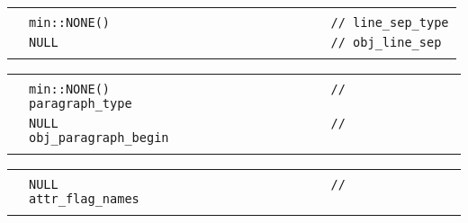 \documentclass[12pt]{article}
\newenvironment{indpar}[1][0.3in]%
	{\begin{list}{}%
		     {\setlength{\itemsep}{0in}%
		      \setlength{\topsep}{0in}%
		      \setlength{\parsep}{1ex}%
		      \setlength{\labelwidth}{#1}%
		      \setlength{\leftmargin}{#1}%
		      \addtolength{\leftmargin}{\labelsep}}%
	 \item}%
	{\end{list}}
\newlength{\ARGBREAKLENGTH}
\newcommand{\ARGBREAK}[1][\ARGBREAKLENGTH]{\\&\hspace*{#1}}
\begin{document}
\begin{indpar}[1em]
\vspace{-4ex}\begin{tabular}{r@{}l}\hspace*{0.1in}\ARGBREAK
\verb|min::NONE()                              // line_sep_type|\ARGBREAK
\verb|NULL                                     // obj_line_sep|\ARGBREAK
\end{tabular}

\vspace{-4ex}\begin{tabular}{r@{}l}\hspace*{0.1in}\ARGBREAK
\verb|min::NONE()                              // paragraph_type|\ARGBREAK
\verb|NULL                                     // obj_paragraph_begin|\ARGBREAK
\end{tabular}

\vspace{-4ex}\begin{tabular}{r@{}l}\hspace*{0.1in}\ARGBREAK
\verb|NULL                                     // attr_flag_names|\ARGBREAK
\end{tabular}\end{indpar}
\end{document}
